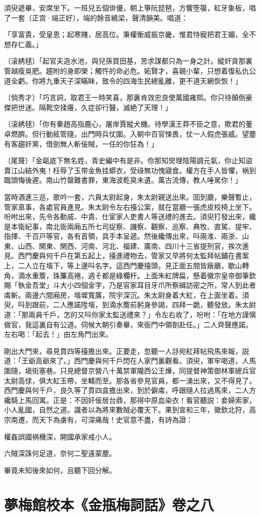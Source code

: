 須臾遞畢，安席坐下。一班兒五個俳優，朝上箏阮琵琶，方響箜篌，紅牙象板，唱了一套〔正宫·端正好〕，端的餘音繞梁，聲清韻美。唱道：

\begin{myquote}
「享富貴，受皇恩；起寒賤，居高位。秉權衡威振京畿，惟君恃寵把君王媚，全不想存仁義。」

{\markfont〔滚綉毬〕}「起官夫造水池，與兒孫買田基，苦求謀都只為一身之計。縱奸貪那裏管越瘦吳肥。趨附的身即榮；觸忤的命必危。妬賢才，喜親小輩，只想着復私仇公道全虧。你將九重天子深瞞眛，致令的四海生民總亂離，更不道天網恢恢！」

{\markfont〔倘秀才〕}「巧言詞，取君王一時笑喜，那裏肯效忠良使萬國雍熙。你只待顛倒豪傑把世迷。隔靴空揉癢，久症卻行醫，滅絶了天理！」

{\markfont〔滚綉毬〕}「你有秦趙高指鹿心，屠岸賈縱犬機。待學漢王莽不臣之意，欺君的董卓燃臍。但行動絃管隨，出門時兵仗圍。入朝中百官悚畏，仗一人假虎張威。望塵有客趨奸黨，借劍無人斬佞賊，一任的你狂為！」

{\markfont〔尾聲〕}「金甌底下無名姓，青史編中有是非。你那知爕理陰陽調元氣，你止知盜賣江山結外夷！枉辱了玉带金魚挂蟒衣，受祿無功愧寢食。權方在手人皆懼，祸到臨頭悔後遲。南山竹罄難書罪，東海波乾臭未遺。萬古流傳，教人唾駡你！」
\end{myquote}

當時酒進三巡，歌吟一套，六員太尉起身，朱太尉親送出來。囬到廳，樂聲暫止，管家禀事，各處官員進見。朱太尉令左右擡公案，就在當廳一張虎皮校椅上坐下。吩咐出來，先令各勳戚、中貴、仕宦家人吏書人等送禮的進去。須臾打發出來，纔是本衛紀事，南北衙兩廂五所七司捉察、譏察、觀察、巡察、典牧、直駕、提牢、指揮、千百戸等官，各有首領，具手本呈遞。然後纔傳出來，呌兩淮、兩浙、山東、山西、関東、関西、河南、河北、福建、廣南、四川十三省提刑官，挨次進見。西門慶與何千戶在第五起上，擡進禮物去，管家又早將何太監拜帖鋪在書案上，二人立在堦下，等上邊呌名字。這西門慶擡頭，見正面五間皆廠廳，歇山轉角，滴水重簷，珠簾高捲，週そ都是綠欄杆。上面朱紅牌扁，懸着徽宗皇帝御筆欽賜「執金吾堂」斗大小四個金字，乃是官家耳目牙爪所察緝訪密之所，常人到此者䖏斬。兩邊六間廂房，堦墀寬廣，院宇深沉。朱太尉身着大紅，在上面坐着。須臾，呌到跟前，二人應諾陞堦，到滴水簷前躬身參謁，四拜一跪，聽發放。朱太尉道：「那兩員千戶，怎的又呌你家太監送禮來？」令左右收了，吩咐：「在地方謹愼做官，我這裏自有公道。伺候大朝引奏畢，來衙門中領劄赴任。」二人齊聲應諾。左右喝：「起去！」由左角門出來。

剛出大門來，尋見賁四等擡擔出來。正要走，忽聽一人㧱宛紅拜帖飛馬來報，説道：「王爺高爺來了。」西門慶與何千戶閃在人家門裏觀看。須臾，軍牢喝道，人馬圍隨，塡街塞巷。只見總督京營八十萬禁軍隴西公王燁，同提督神策御林軍總兵官太尉高俅，俱大紅玉帶，坐轎而至。那各省參見官員，都一湧出來，又不得見了。西門慶與何千戶，良久等了賁四盒擔出來，到於僻䖏，呼跟隨人拉過馬來，二人方纔騎上馬回寓。正是：不因奸佞居台鼎，那得中原血染衣！看官聽説：妾婦索家，小人亂國，自然之道。識者以為將來數賊必覆天下。果到宣和三年，徽欽北狩，高宗南遷，而天下為虜有，可深痛哉！史官意不盡，有詩為證：

\begin{myquote}
權姦誤國祸機深，開國承家戒小人。

六賊深誅何足道，奈何二聖遠蒙塵。
\end{myquote}

畢竟未知後來如何，且聽下回分解。

\part*{夢梅館校本《金瓶梅詞話》卷之八}

